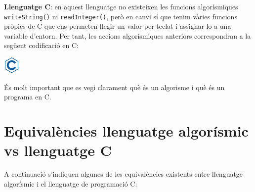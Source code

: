 \documentclass[]{book}
\newenvironment{Shaded}{\begin{snugshade}}{\end{snugshade}}
\newcommand{\DataTypeTok}[1]{\textcolor[rgb]{0.13,0.29,0.53}{#1}}
\newcommand{\DecValTok}[1]{\textcolor[rgb]{0.00,0.00,0.81}{#1}}
\newcommand{\StringTok}[1]{\textcolor[rgb]{0.31,0.60,0.02}{#1}}
\newcommand{\ImportTok}[1]{#1}
\newcommand{\ControlFlowTok}[1]{\textcolor[rgb]{0.13,0.29,0.53}{\textbf{#1}}}
\newcommand{\PreprocessorTok}[1]{\textcolor[rgb]{0.56,0.35,0.01}{\textit{#1}}}
\newcommand{\NormalTok}[1]{#1}
\begin{document}
\textbf{Llenguatge C}: en aquest llenguatge no existeixen les funcions
algorísmiques \texttt{writeString()} ni \texttt{readInteger()}, però en
canvi sí que tenim vàries funcions pròpies de C que ens permeten llegir
un valor per teclat i assignar-lo a una variable d'entorn. Per tant, les
accions algorísmiques anteriors correspondran a la següent codificació
en C:

\includegraphics{./img/c.png}

\begin{Shaded}
\end{Shaded}

És molt important que es vegi clarament què és un algorisme i què és un
programa en C.

\section{Equivalències llenguatge algorísmic vs llenguatge
C}\label{equivalencies-llenguatge-algorismic-vs-llenguatge-c}

A continuació s'indiquen algunes de les equivalències existents entre
llenguatge algorísmic i el llenguatge de programació C:
\end{document}
